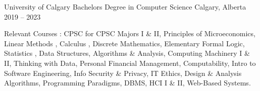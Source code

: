 \documentclass[]{awesome-cv}
\begin{document}
    
\makecvheader[C]

	
\vspace{-5mm}
\begin{cventries}
    \vspace{-2mm}
	\cventry
	{University of Calgary}
	{Bachelor\textquotesingle{}s Degree in Computer Science}
	{Calgary, Alberta}
	{2019 – 2023}
    {
      \begin{cvparagraph} %
        {Relevant Courses : CPSC for CPSC Majors I \& II, Principles of Microeconomics, Linear Methods , Calculus , Discrete Mathematics, Elementary Formal Logic, Statistics , Data Structures, Algorithms \& Analysis, Computing Machinery I \& II, Thinking with Data, Personal Financial Management, Computability, Intro to Software Engineering, Info Security \& Privacy, IT Ethics, Design \& Analysis Algorithms, Programming Paradigms, DBMS, HCI I \& II, Web-Based Systems.}
      \end{cvparagraph}
      }
     


\end{cventries}
\end{document}
